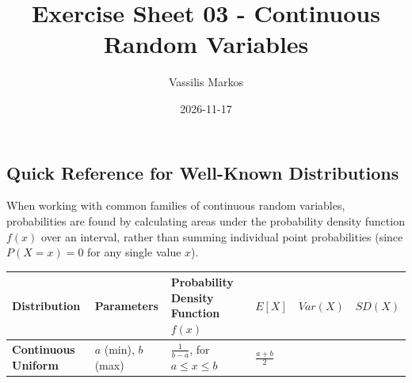 \documentclass[
]{article}
\title{Exercise Sheet 03 - Continuous Random Variables}
\author{Vassilis Markos}
\date{2026-11-17}
\newcounter{none} %
\begin{document}
\maketitle

\subsection{Quick Reference for Well-Known
Distributions}\label{quick-reference-for-well-known-distributions}

When working with common families of continuous random variables,
probabilities are found by calculating areas under the probability
density function \(f(x)\) over an interval, rather than summing
individual point probabilities (since \(P(X = x) = 0\) for any single
value \(x\)).

{\def\LTcaptype{none} %
\begin{longtable}[]{@{}
  >{\raggedright\arraybackslash}p{}
  >{\raggedright\arraybackslash}p{}
  >{\raggedright\arraybackslash}p{}
  >{\raggedright\arraybackslash}p{}
  >{\raggedright\arraybackslash}p{}
  >{\raggedright\arraybackslash}p{}@{}}
\toprule\noalign{}
\begin{minipage}[b]{\linewidth}\raggedright
Distribution
\end{minipage} & \begin{minipage}[b]{\linewidth}\raggedright
Parameters
\end{minipage} & \begin{minipage}[b]{\linewidth}\raggedright
Probability Density Function \(f(x)\)
\end{minipage} & \begin{minipage}[b]{\linewidth}\raggedright
\(E[X]\)
\end{minipage} & \begin{minipage}[b]{\linewidth}\raggedright
\(Var(X)\)
\end{minipage} & \begin{minipage}[b]{\linewidth}\raggedright
\(SD(X)\)
\end{minipage} \\
\midrule\noalign{}
\endhead
\bottomrule\noalign{}
\endlastfoot
\textbf{Continuous Uniform} & \(a\) (min), \(b\) (max) &
\(\frac{1}{b-a}\), for \(a \le x \le b\) & \(\frac{a+b}{2}\) &

\end{longtable}}
\end{document}
